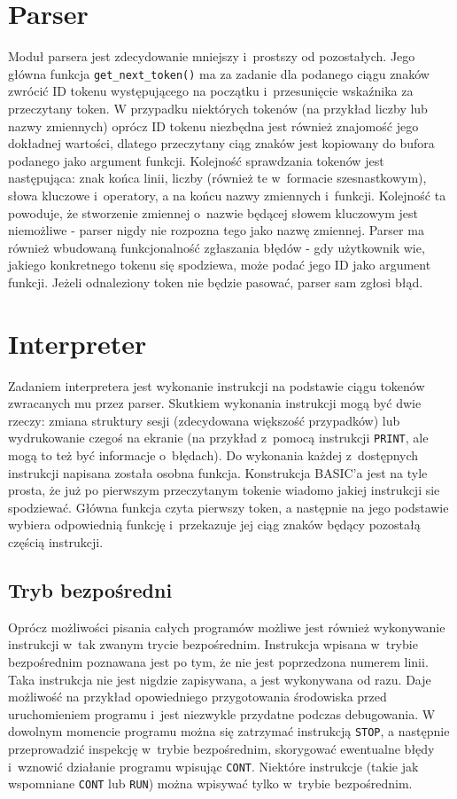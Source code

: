 \documentclass[shortabstract]{iithesis}
\begin{document}
\section{Parser}
  Moduł parsera jest zdecydowanie mniejszy i~prostszy od pozostałych. Jego główna funkcja \texttt{get\_next\_token()} ma za zadanie dla podanego ciągu znaków zwrócić ID tokenu występującego na początku i~przesunięcie wskaźnika za przeczytany token. W przypadku niektórych tokenów (na przykład liczby lub nazwy zmiennych) oprócz ID  tokenu niezbędna jest również znajomość jego dokładnej wartości, dlatego przeczytany ciąg znaków jest kopiowany do bufora podanego jako argument funkcji. Kolejność sprawdzania tokenów jest następująca: znak końca linii, liczby (również te w~formacie szesnastkowym), słowa kluczowe i~operatory, a na końcu nazwy zmiennych i~funkcji. Kolejność ta powoduje, że stworzenie zmiennej o~nazwie będącej słowem kluczowym jest niemożliwe - parser nigdy nie rozpozna tego jako nazwę zmiennej. Parser ma również wbudowaną funkcjonalność zgłaszania błędów - gdy użytkownik wie, jakiego konkretnego tokenu się spodziewa, może podać jego ID jako argument funkcji. Jeżeli odnaleziony token nie będzie pasować, parser sam zgłosi błąd.

\section{Interpreter}
  Zadaniem interpretera jest wykonanie instrukcji na podstawie ciągu tokenów zwracanych mu przez parser. Skutkiem wykonania instrukcji mogą być dwie rzeczy: zmiana struktury sesji (zdecydowana większość przypadków) lub wydrukowanie czegoś na ekranie (na przykład z~pomocą instrukcji \texttt{PRINT}, ale mogą to też być informacje o~błędach). Do wykonania każdej z~dostępnych instrukcji napisana została osobna funkcja. Konstrukcja BASIC'a jest na tyle prosta, że już po pierwszym przeczytanym tokenie wiadomo jakiej instrukcji sie spodziewać. Główna funkcja czyta pierwszy token, a następnie na jego podstawie wybiera odpowiednią funkcję i~przekazuje jej ciąg znaków będący pozostałą częścią instrukcji.
\subsection{Tryb bezpośredni}
Oprócz możliwości pisania całych programów możliwe jest również wykonywanie instrukcji w~tak zwanym trycie bezpośrednim. Instrukcja wpisana w~trybie bezpośrednim poznawana jest po tym, że nie jest poprzedzona numerem linii. Taka instrukcja nie jest nigdzie zapisywana, a jest wykonywana od razu. Daje możliwość na przykład opowiedniego przygotowania środowiska przed uruchomieniem programu i~jest niezwykle przydatne podczas debugowania. W dowolnym momencie programu można się zatrzymać instrukcją \texttt{STOP}, a następnie przeprowadzić inspekcję w~trybie bezpośrednim, skorygować ewentualne błędy i~wznowić działanie programu wpisując \texttt{CONT}. Niektóre instrukcje (takie jak wspomniane \texttt{CONT} lub \texttt{RUN}) można wpisywać tylko w~trybie bezpośrednim.
\end{document}

